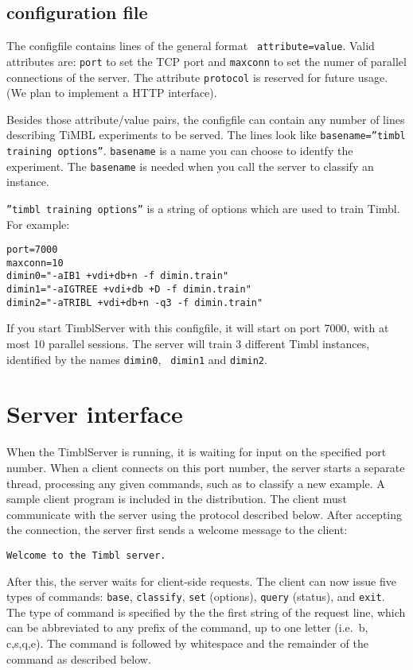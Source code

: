 \documentclass{report}
\begin{document}
\subsection{configuration file}
\label{configfile}
The configfile contains lines of the general format {\tt
  attribute=value}.  Valid attributes are: {\tt port} to set the TCP
port and {\tt maxconn} to set the numer of parallel connections of the
server. The attribute {\tt protocol} is reserved for future usage. (We
plan to implement a HTTP interface).

Besides those attribute/value pairs, the configfile can contain any
number of lines describing TiMBL experiments to be served. The lines
look like {\tt basename=''timbl training options''}.  {\tt basename}
is a name you can choose to identfy the experiment. The {\tt basename}
is needed when you call the server to classify an instance.

{\tt ''timbl training options''} is a string of options which are used
to train Timbl. For example:

\begin{verbatim}
port=7000
maxconn=10
dimin0="-aIB1 +vdi+db+n -f dimin.train"
dimin1="-aIGTREE +vdi+db +D -f dimin.train"
dimin2="-aTRIBL +vdi+db+n -q3 -f dimin.train"
\end{verbatim}

If you start TimblServer with this configfile, it will start on port
7000, with at most 10 parallel sessions. The server will train 3
different Timbl instances, identified by the names {\tt dimin0}, {\tt
  dimin1} and {\tt dimin2}.

\section{Server interface}
\label{serverformat}

When the TimblServer is running, it is waiting for input on the
specified port number. When a client connects on this port number, the
server starts a separate thread, processing any given commands, such
as to classify a new example. A sample client program is included in
the distribution. The client must communicate with the server using
the protocol described below. After accepting the connection, the
server first sends a welcome message to the client:

{\tt Welcome to the Timbl server.}

After this, the server waits for client-side requests.  The client can
now issue five types of commands: {\tt base}, {\tt classify}, {\tt set} (options), {\tt query} (status), and {\tt exit}. The type of command is specified by the the first string of the request line, which can be abbreviated to any prefix of
the command, up to one letter (i.e.~b, c,s,q,e). The command is
followed by whitespace and the remainder of the command as described
below.
\end{document}
